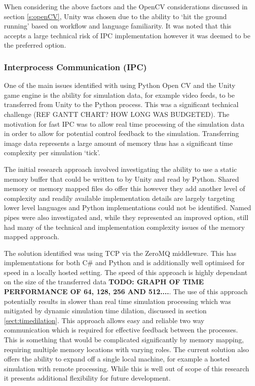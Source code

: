 \documentclass[]{aiaa-tc}%
\begin{document}
When considering the above factors and the OpenCV considerations discussed in section \ref{s:openCV}, Unity was chosen due to the ability to `hit the ground running' based on workflow and language familiarity. It was noted that this accepts a large technical risk of IPC implementation however it was deemed to be the preferred option.

\subsubsection{Interprocess Communication (IPC)} \label{s:IPC}

One of the main issues identified with using Python Open CV and the Unity game engine is the ability for simulation data, for example video feeds, to be transferred from Unity to the Python process. This was a significant technical challenge (REF GANTT CHART? HOW LONG WAS BUDGETED). The motivation for fast IPC was to allow real time processing of the simulation data in order to allow for potential control feedback to the simulation. Transferring image data represents a large amount of memory thus has a significant time complexity per simulation `tick'. 

The initial research approach involved investigating the ability to use a static memory buffer that could be written to by Unity and read by Python. Shared memory or memory mapped files do offer this however they add another level of complexity and readily available implementation details are largely targeting lower level languages and Python implementations could not be identified. Named pipes were also investigated and, while they represented an improved option, still had many of the technical and implementation complexity issues of the memory mapped approach.

The solution identified was using TCP via the ZeroMQ middleware. This has implementations for both C\# and Python and is additionally well optimised for speed in a locally hosted setting. The speed of this approach is highly dependant on the size of the transferred data \textbf{TODO: GRAPH OF TIME PERFORMANCE OF 64, 128, 256 AND 512....}. The use of this approach potentially results in slower than real time simulation processing which was mitigated by dynamic simulation time dilation, discussed in section \ref{sect:timedilation}. This approach allows easy and reliable two way communication which is required for effective feedback between the processes. This is something that would be complicated significantly by memory mapping, requiring multiple memory locations with varying roles. The current solution also offers the ability to expand off a single local machine, for example a hosted simulation with remote processing. While this is well out of scope of this research it presents additional flexibility for future development.
\end{document}

